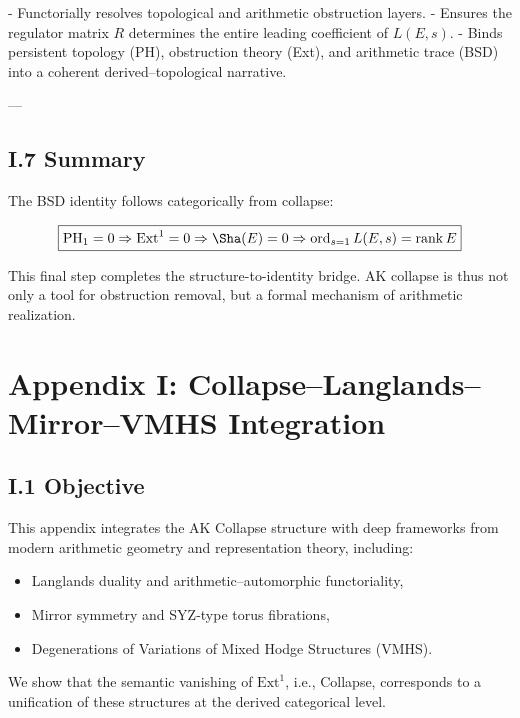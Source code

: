 \documentclass[11pt]{article}
\theoremstyle{definition}
\begin{document}
- Functorially resolves topological and arithmetic obstruction layers.
- Ensures the regulator matrix \( R \) determines the entire leading coefficient of \( L(E,s) \).
- Binds persistent topology (PH), obstruction theory (Ext), and arithmetic trace (BSD) into a coherent derived–topological narrative.

---

\subsection*{I.7 Summary}

The BSD identity follows categorically from collapse:

\[
\boxed{
\mathrm{PH}_1 = 0 \Rightarrow \mathrm{Ext}^1 = 0 \Rightarrow \Sha(E) = 0 \Rightarrow \operatorname{ord}_{s=1} L(E,s) = \operatorname{rank} E
}
\]

This final step completes the structure-to-identity bridge.  
AK collapse is thus not only a tool for obstruction removal,  
but a formal mechanism of arithmetic realization.



\section*{Appendix I: Collapse–Langlands–Mirror–VMHS Integration}

\subsection*{I.1 Objective}

This appendix integrates the AK Collapse structure  
with deep frameworks from modern arithmetic geometry and representation theory, including:

\begin{itemize}
  \item Langlands duality and arithmetic–automorphic functoriality,
  \item Mirror symmetry and SYZ-type torus fibrations,
  \item Degenerations of Variations of Mixed Hodge Structures (VMHS).
\end{itemize}

We show that the semantic vanishing of \( \mathrm{Ext}^1 \), i.e., Collapse,  
corresponds to a unification of these structures at the derived categorical level.
\end{document}
